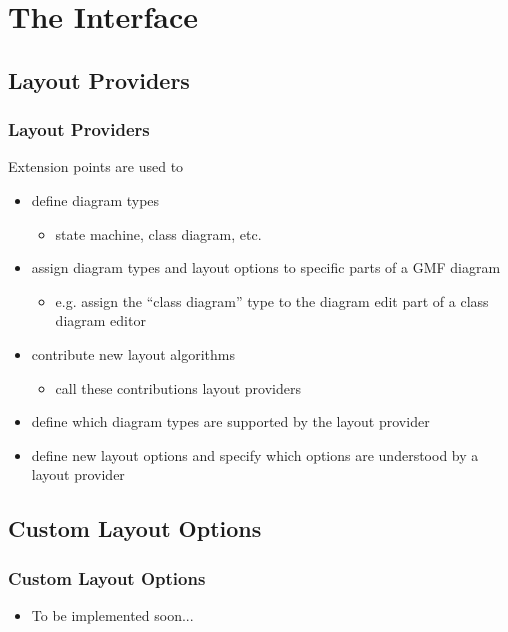 \section{The Interface}

\subsection{Layout Providers}
\begin{frame}
  \frametitle{Layout Providers}
  Extension points are used to
  \begin{itemize}
    \item<1-> define diagram types
      \begin{itemize}
        \item {\small state machine, class diagram, etc.}
      \end{itemize}
    \item<2-> assign diagram types and layout options to specific parts of a GMF diagram
      \begin{itemize}
        \item {\small e.g. assign the ``class diagram'' type to the diagram edit part
          of a class diagram editor}
      \end{itemize}
    \item<3-> contribute new layout algorithms
      \begin{itemize}
        \item {\small call these contributions \alert{layout providers}}
      \end{itemize}
    \item<4-> define which diagram types are supported by the layout provider
    \item<5-> define new layout options and specify which options are understood
      by a layout provider
  \end{itemize}
\end{frame}

\subsection{Custom Layout Options}
\begin{frame}
  \frametitle{Custom Layout Options}
  \begin{itemize}
    \item To be implemented soon...
  \end{itemize}
\end{frame}

